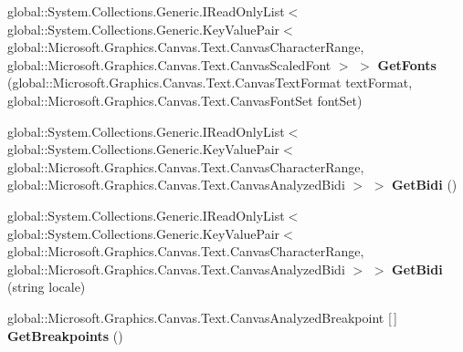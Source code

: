 \begin{DoxyCompactItemize}
\item 
\mbox{\label{interface_microsoft_1_1_graphics_1_1_canvas_1_1_text_1_1_i_canvas_text_analyzer_afe87e79f1d9d43241df23f2f1835733d}} 
global\+::\+System.\+Collections.\+Generic.\+I\+Read\+Only\+List$<$ global\+::\+System.\+Collections.\+Generic.\+Key\+Value\+Pair$<$ global\+::\+Microsoft.\+Graphics.\+Canvas.\+Text.\+Canvas\+Character\+Range, global\+::\+Microsoft.\+Graphics.\+Canvas.\+Text.\+Canvas\+Scaled\+Font $>$ $>$ {\bfseries Get\+Fonts} (global\+::\+Microsoft.\+Graphics.\+Canvas.\+Text.\+Canvas\+Text\+Format text\+Format, global\+::\+Microsoft.\+Graphics.\+Canvas.\+Text.\+Canvas\+Font\+Set font\+Set)
\item 
\mbox{\label{interface_microsoft_1_1_graphics_1_1_canvas_1_1_text_1_1_i_canvas_text_analyzer_ab5391603e9550535647efdab365121e0}} 
global\+::\+System.\+Collections.\+Generic.\+I\+Read\+Only\+List$<$ global\+::\+System.\+Collections.\+Generic.\+Key\+Value\+Pair$<$ global\+::\+Microsoft.\+Graphics.\+Canvas.\+Text.\+Canvas\+Character\+Range, global\+::\+Microsoft.\+Graphics.\+Canvas.\+Text.\+Canvas\+Analyzed\+Bidi $>$ $>$ {\bfseries Get\+Bidi} ()
\item 
\mbox{\label{interface_microsoft_1_1_graphics_1_1_canvas_1_1_text_1_1_i_canvas_text_analyzer_a00b2a6c66d95fcf0eb8cb93429692433}} 
global\+::\+System.\+Collections.\+Generic.\+I\+Read\+Only\+List$<$ global\+::\+System.\+Collections.\+Generic.\+Key\+Value\+Pair$<$ global\+::\+Microsoft.\+Graphics.\+Canvas.\+Text.\+Canvas\+Character\+Range, global\+::\+Microsoft.\+Graphics.\+Canvas.\+Text.\+Canvas\+Analyzed\+Bidi $>$ $>$ {\bfseries Get\+Bidi} (string locale)
\item 
\mbox{\label{interface_microsoft_1_1_graphics_1_1_canvas_1_1_text_1_1_i_canvas_text_analyzer_aae3059f7ac90b34a23ffa7061184bf59}} 
global\+::\+Microsoft.\+Graphics.\+Canvas.\+Text.\+Canvas\+Analyzed\+Breakpoint \mbox{[}$\,$\mbox{]} {\bfseries Get\+Breakpoints} ()
\item 
\mbox{\label{interface_microsoft_1_1_graphics_1_1_canvas_1_1_text_1_1_i_canvas_text_analyzer_aed1856403ffb2ff3f563c0010aeea194}} 

\end{DoxyCompactItemize}
